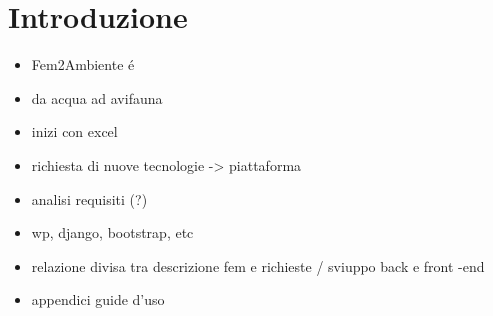 \chapter{Introduzione} 

\begin{itemize}
\item Fem2Ambiente é
\item da acqua ad avifauna
\item inizi con excel
\item richiesta di nuove tecnologie -> piattaforma
\item analisi requisiti (?)
\item wp, django, bootstrap, etc
\item relazione divisa tra descrizione fem e richieste / sviuppo back e front -end
\item appendici guide d'uso
\end{itemize}